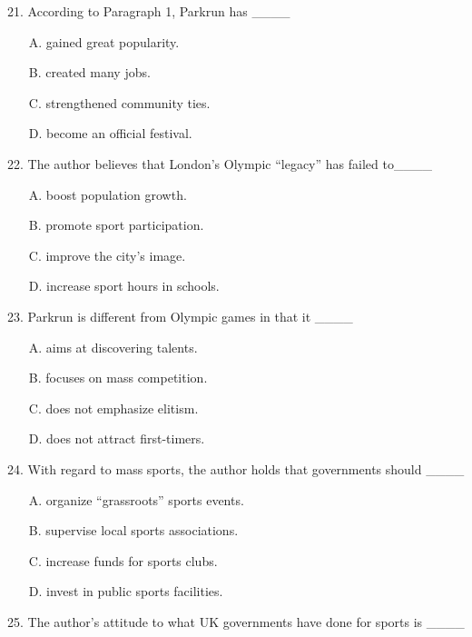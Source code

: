\documentclass[UTF8,11pt]{ctexart}
\begin{document}
21. According to Paragraph 1, Parkrun has \_\_\_\_


\begin{itemize}[leftmargin=2em,itemsep=.2em,topsep=.4em]\item[A.] gained great popularity.
\item[B.] created many jobs.
\item[C.] strengthened community ties.
\item[D.] become an official festival.
\end{itemize}

22. The author believes that London’s Olympic “legacy” has failed to\_\_\_\_


\begin{itemize}[leftmargin=2em,itemsep=.2em,topsep=.4em]\item[A.] boost population growth.
\item[B.] promote sport participation.
\item[C.] improve the city’s image.
\item[D.] increase sport hours in schools.
\end{itemize}

23. Parkrun is different from Olympic games in that it \_\_\_\_


\begin{itemize}[leftmargin=2em,itemsep=.2em,topsep=.4em]\item[A.] aims at discovering talents.
\item[B.] focuses on mass competition.
\item[C.] does not emphasize elitism.
\item[D.] does not attract first-timers.
\end{itemize}

24. With regard to mass sports, the author holds that governments should \_\_\_\_


\begin{itemize}[leftmargin=2em,itemsep=.2em,topsep=.4em]\item[A.] organize “grassroots” sports events.
\item[B.] supervise local sports associations.
\item[C.] increase funds for sports clubs.
\item[D.] invest in public sports facilities.
\end{itemize}

25. The author’s attitude to what UK governments have done for sports is \_\_\_\_
\end{document}
